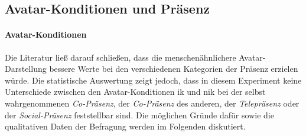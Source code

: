 \documentclass[a4paper,11pt]{article}%
\renewcommand{\\}{\vspace*{0.5\baselineskip} \newline}
\begin{document}
{{%
%
%
%
%
%
%

\subsection{Avatar-Konditionen und Präsenz}
\paragraph{Avatar-Konditionen}
Die Literatur ließ darauf schließen, dass die menschenähnlichere Avatar-Darstellung bessere Werte bei den verschiedenen Kategorien der Präsenz erzielen würde. Die statistische Auswertung zeigt jedoch, dass in diesem Experiment keine Unterschiede zwischen den Avatar-Konditionen \ac{ik} und \ac{nik} bei der selbst wahrgenommenen \textit{Co-Präsenz}, der \textit{Co-Präsenz} des anderen, der \textit{Telepräsenz} oder der \textit{Social-Präsenz} feststellbar sind. Die möglichen Gründe dafür sowie die qualitativen Daten der Befragung werden im Folgenden diskutiert.

}}
\end{document}
